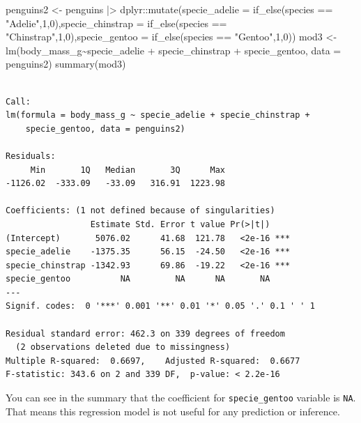 \documentclass[
  letterpaper,
  paper =a4,
  twoside,
  openright,
  headsepline,
  footsepline,
  listof = totocnumbered,
  chapterprefix = true,
  firstiscover,
  parskip = full*]{scrbook}
\newenvironment{Shaded}{\begin{snugshade}}{\end{snugshade}}
\newcommand{\AttributeTok}[1]{\textcolor[rgb]{0.40,0.45,0.13}{#1}}
\newcommand{\DecValTok}[1]{\textcolor[rgb]{0.68,0.00,0.00}{#1}}
\newcommand{\FunctionTok}[1]{\textcolor[rgb]{0.28,0.35,0.67}{#1}}
\newcommand{\NormalTok}[1]{\textcolor[rgb]{0.00,0.23,0.31}{#1}}
\newcommand{\OtherTok}[1]{\textcolor[rgb]{0.00,0.23,0.31}{#1}}
\newcommand{\SpecialCharTok}[1]{\textcolor[rgb]{0.37,0.37,0.37}{#1}}
\newcommand{\StringTok}[1]{\textcolor[rgb]{0.13,0.47,0.30}{#1}}
\begin{document}
\begin{Shaded}
\begin{Highlighting}[]
\NormalTok{penguins2 }\OtherTok{\textless{}{-}}\NormalTok{ penguins }\SpecialCharTok{|\textgreater{}} 
\NormalTok{  dplyr}\SpecialCharTok{::}\FunctionTok{mutate}\NormalTok{(}\AttributeTok{specie\_adelie =} \FunctionTok{if\_else}\NormalTok{(species }\SpecialCharTok{==} \StringTok{"Adelie"}\NormalTok{,}\DecValTok{1}\NormalTok{,}\DecValTok{0}\NormalTok{),}\AttributeTok{specie\_chinstrap =} \FunctionTok{if\_else}\NormalTok{(species }\SpecialCharTok{==} \StringTok{"Chinstrap"}\NormalTok{,}\DecValTok{1}\NormalTok{,}\DecValTok{0}\NormalTok{),}\AttributeTok{specie\_gentoo =} \FunctionTok{if\_else}\NormalTok{(species }\SpecialCharTok{==} \StringTok{"Gentoo"}\NormalTok{,}\DecValTok{1}\NormalTok{,}\DecValTok{0}\NormalTok{))}
\NormalTok{mod3 }\OtherTok{\textless{}{-}} \FunctionTok{lm}\NormalTok{(body\_mass\_g}\SpecialCharTok{\textasciitilde{}}\NormalTok{specie\_adelie }\SpecialCharTok{+}\NormalTok{ specie\_chinstrap }\SpecialCharTok{+}\NormalTok{ specie\_gentoo, }\AttributeTok{data =}\NormalTok{ penguins2)}
\FunctionTok{summary}\NormalTok{(mod3)}
\end{Highlighting}
\end{Shaded}

\begin{verbatim}

Call:
lm(formula = body_mass_g ~ specie_adelie + specie_chinstrap + 
    specie_gentoo, data = penguins2)

Residuals:
     Min       1Q   Median       3Q      Max 
-1126.02  -333.09   -33.09   316.91  1223.98 

Coefficients: (1 not defined because of singularities)
                 Estimate Std. Error t value Pr(>|t|)    
(Intercept)       5076.02      41.68  121.78   <2e-16 ***
specie_adelie    -1375.35      56.15  -24.50   <2e-16 ***
specie_chinstrap -1342.93      69.86  -19.22   <2e-16 ***
specie_gentoo          NA         NA      NA       NA    
---
Signif. codes:  0 '***' 0.001 '**' 0.01 '*' 0.05 '.' 0.1 ' ' 1

Residual standard error: 462.3 on 339 degrees of freedom
  (2 observations deleted due to missingness)
Multiple R-squared:  0.6697,    Adjusted R-squared:  0.6677 
F-statistic: 343.6 on 2 and 339 DF,  p-value: < 2.2e-16
\end{verbatim}

You can see in the summary that the coefficient for
\texttt{specie\_gentoo} variable is \texttt{NA}. That means this
regression model is not useful for any prediction or inference.
\end{document}
